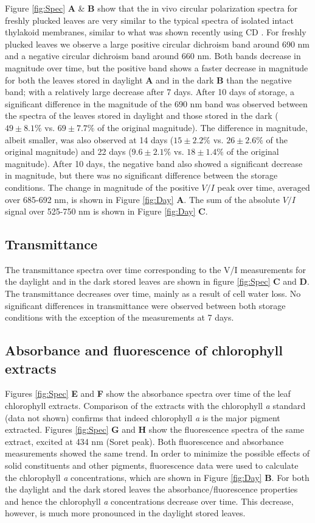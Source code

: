 \documentclass[review]{elsarticle}
\begin{document}
Figure \ref{fig:Spec} \textbf{A} \& \textbf{B} show that the in vivo circular polarization spectra for freshly plucked leaves are very similar to the typical spectra of isolated intact thylakoid membranes, similar to what was shown recently using CD \cite{Toth2016}. For freshly plucked leaves we observe a large positive circular dichroism band around 690 nm and a negative circular dichroism band around 660 nm. Both bands decrease in magnitude over time, but the positive band shows a faster decrease in magnitude for both the leaves stored in daylight \textbf{A} and in the dark \textbf{B} than the negative band; with a relatively large decrease after 7 days.
After 10 days of storage, a significant difference in the magnitude of the 690 nm band was observed between the spectra of the leaves stored in daylight and those stored in the dark ($49\pm  8.1\%$ vs. $69\pm 7.7 \%$ of the original magnitude). The difference in magnitude, albeit smaller, was also observed at 14 days ($15\pm  2.2\%$ vs. $26\pm 2.6 \%$ of the original magnitude) and 22 days ($9.6\pm  2.1\%$ vs. $18\pm 1.4 \%$ of the original magnitude). After 10 days, the negative band also showed a significant decrease in magnitude, but there was no significant difference between the storage conditions. The change in magnitude of the positive $V/I$ peak over time, averaged over 685-692 nm, is shown in Figure \ref{fig:Day} \textbf{A}. The sum of the absolute $V/I$ signal over 525-750 nm is shown in Figure \ref{fig:Day} \textbf{C}.


\subsection{Transmittance}
The transmittance spectra over time corresponding to the V/I measurements for the daylight and in the dark stored leaves are shown in figure \ref{fig:Spec} \textbf{C} and \textbf{D}. The transmittance decreases over time, mainly as a result of cell water loss. No significant differences in transmittance were observed between both storage conditions with the exception of the measurements at 7 days.

\subsection{Absorbance and fluorescence of chlorophyll extracts}
Figures \ref{fig:Spec} \textbf{E} and \textbf{F} show the absorbance spectra over time of the leaf chlorophyll extracts. Comparison of the extracts with the chlorophyll \textit{a} standard (data not shown) confirms that indeed chlorophyll \textit{a} is the major pigment extracted. Figures \ref{fig:Spec} \textbf{G} and \textbf{H} show the fluorescence spectra of the same extract, excited at 434 nm (Soret peak). Both fluorescence and absorbance measurements showed the same trend. In order to minimize the possible effects of solid constituents and other pigments, fluorescence data were used to calculate the chlorophyll \textit{a} concentrations, which are shown in Figure \ref{fig:Day} \textbf{B}. For both the daylight and the dark stored leaves the absorbance/fluorescence properties and hence the chlorophyll \textit{a} concentrations decrease over time. This decrease, however, is much more pronounced in the daylight stored leaves.
\end{document}
